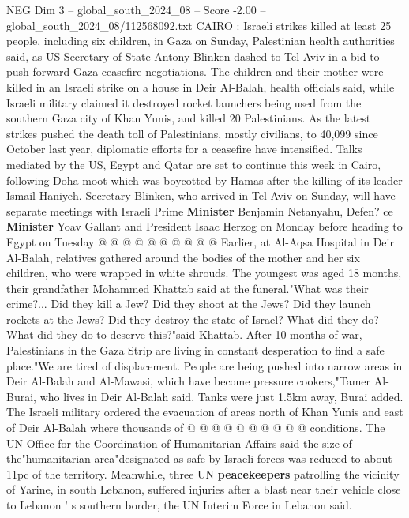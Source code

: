 \begin{textsample}{NEG Dim 3 – global\_south\_2024\_08 – Score -2.00 – global\_south\_2024\_08/112568092.txt}  \label{ex:f3_neg_151}
CAIRO : Israeli strikes killed at least 25 people, including six children, in Gaza on Sunday, Palestinian health authorities said, as US Secretary of State Antony Blinken dashed to Tel Aviv in a bid to push forward Gaza ceasefire negotiations.
The children and their mother were killed in an Israeli strike on a house in Deir Al-Balah, health officials said, while Israeli military claimed it destroyed rocket launchers being used from the southern Gaza city of Khan Yunis, and killed 20 Palestinians.
As the latest strikes pushed the death toll of Palestinians, mostly civilians, to 40,099 since October last year, diplomatic efforts for a ceasefire have intensified.
Talks mediated by the US, Egypt and Qatar are set to continue this week in Cairo, following Doha moot which was boycotted by Hamas after the killing of its leader Ismail Haniyeh.
Secretary Blinken, who arrived in Tel Aviv on Sunday, will have separate meetings with Israeli Prime \textbf{Minister} Benjamin Netanyahu, Defen? ce \textbf{Minister} Yoav Gallant and President Isaac Herzog on Monday before heading to Egypt on Tuesday @ @ @ @ @ @ @ @ @ @ Earlier, at Al-Aqsa Hospital in Deir Al-Balah, relatives gathered around the bodies of the mother and her six children, who were wrapped in white shrouds.
The youngest was aged 18 months, their grandfather Mohammed Khattab said at the funeral."What was their crime?...
Did they kill a Jew?
Did they shoot at the Jews?
Did they launch rockets at the Jews?
Did they destroy the state of Israel?
What did they do?
What did they do to deserve this?"said Khattab.
After 10 months of war, Palestinians in the Gaza Strip are living in constant desperation to find a safe place."We are tired of displacement.
People are being pushed into narrow areas in Deir Al-Balah and Al-Mawasi, which have become pressure cookers,"Tamer Al-Burai, who lives in Deir Al-Balah said.
Tanks were just 1.5km away, Burai added.
The Israeli military ordered the evacuation of areas north of Khan Yunis and east of Deir Al-Balah where thousands of @ @ @ @ @ @ @ @ @ @ conditions.
The UN Office for the Coordination of Humanitarian Affairs said the size of the"humanitarian area"designated as safe by Israeli forces was reduced to about 11pc of the territory.
Meanwhile, three UN \textbf{peacekeepers} patrolling the vicinity of Yarine, in south Lebanon, suffered injuries after a blast near their vehicle close to Lebanon ' s southern border, the UN Interim Force in Lebanon said.

\end{textsample}
